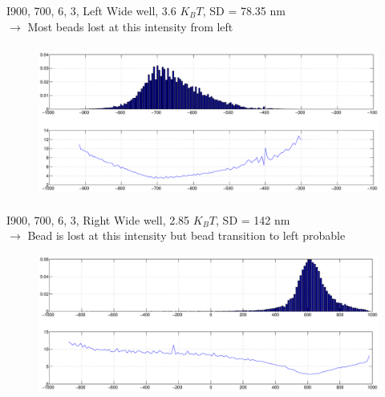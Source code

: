 \documentclass{beamer}
\begin{document}
\begin{frame}{I900, 700, 6, 3, Left} 
Wide well, 3.6 $K_BT$, SD = 78.35 nm \\$\rightarrow$ Most beads lost at this intensity from left
\begin{figure}
    \centering
    \includegraphics[height=5cm,width=12cm]{I900_left_3.eps}
    \label{fig:graph16}
\end{figure}


\end{frame}

\begin{frame}{I900, 700, 6, 3, Right} 
Wide well, 2.85 $K_BT$, SD = 142 nm \\$\rightarrow$ Bead is lost at this intensity but bead transition to left probable
\begin{figure}
    \centering
    \includegraphics[height=4.5cm,width=12cm]{I900_both_1.eps}
    \label{fig:graph17}
\end{figure}


\end{frame}
\end{document}
